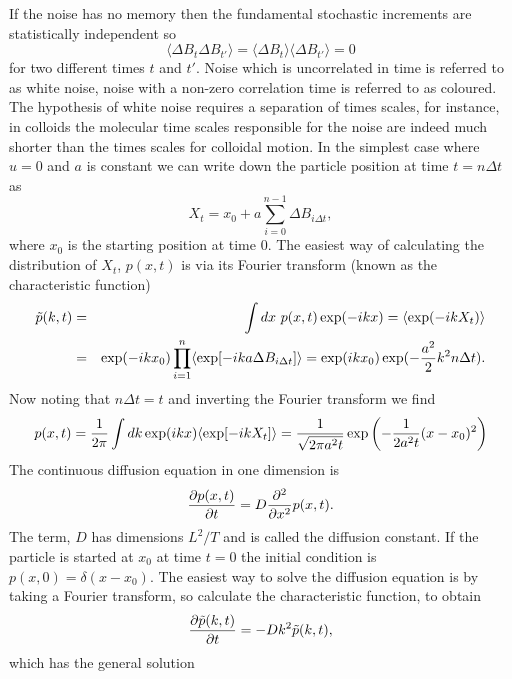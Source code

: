 \documentclass[11pt]{report}
\begin{document}
If the noise has no memory then the fundamental  stochastic increments are statistically independent so
\begin{equation}
\langle\Delta B_t \Delta B_{t'}\rangle = \langle\Delta B_t \rangle
\langle\Delta B_{t'}\rangle = 0
\end{equation}
for two different times $t$ and $t'$. Noise which is uncorrelated in time is referred to as white noise, noise with a non-zero correlation time is referred to as coloured. The hypothesis of white noise requires a separation of times scales, for instance, in colloids the molecular time scales responsible for the noise are indeed much shorter than the times scales for colloidal motion. In the simplest case where $u=0$ and $a$ is constant we can write down the particle position at time $t= n\Delta t$ as
\begin{equation}
X_t = x_0+ a\sum_{i=0}^{n-1} \Delta B_{i\Delta t},
\end{equation}
where $x_0$ is the starting position at time $0$. The easiest way of calculating the distribution of $X_t$, $p(x,t)$ is via its Fourier transform (known as the characteristic function)
\begin{eqnarray}
\tilde p(k,t)&=& \int dx \ p(x,t) \exp(-ikx) = \langle\exp(-i k X_t)\rangle \nonumber \\
&=& \exp(-ik x_0) \prod_{i=1}^n \langle\exp[-i k a\Delta B_{i\Delta t}]\rangle= \exp(ik x_0)\exp(-{a^2\over 2} k^2 n \Delta t).
\end{eqnarray}
Now noting that $n\Delta t= t$ and inverting the Fourier transform we find
\begin{equation}
p(x,t) = {1\over 2\pi}\int dk \exp(ikx)\langle\exp[-i k X_t]\rangle = {1\over \sqrt{2\pi a^2t}}
\exp\left(-{1\over 2a^2 t} (x-x_0)^2\right)
\end{equation}
The continuous diffusion equation in one dimension is 
\begin{equation}
{\partial p(x,t)\over \partial t} = D{\partial ^2\over \partial x^2}p(x,t).
\end{equation}
The term, $D$ has dimensions $L^2/T$ and is called the diffusion constant. If the particle is started at $x_0$ at time $t=0$ the initial condition is $p(x,0) = \delta(x-x_0)$.
The easiest way to solve the diffusion equation is by taking a Fourier transform, so calculate
the characteristic function, to obtain
\begin{equation}
{\partial \tilde p(k,t)\over \partial t}= -Dk^2\tilde p(k,t),
\end{equation}
which has the general solution
\end{document}
